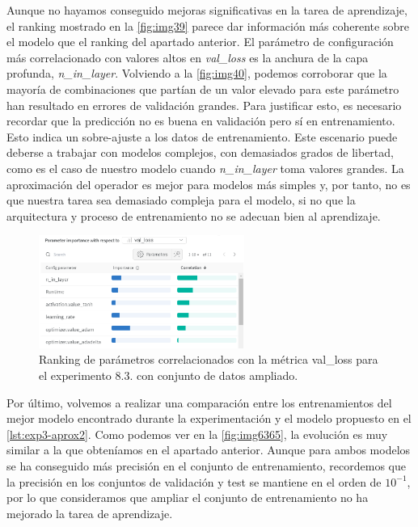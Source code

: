  Aunque no hayamos conseguido mejoras significativas en la tarea de aprendizaje, el ranking mostrado en la \autoref{fig:img39} parece dar información más coherente sobre el modelo que el ranking del apartado anterior. El parámetro de configuración más correlacionado con valores altos en \textit{val\_loss} es la anchura de la capa profunda, \textit{n\_in\_layer}. Volviendo a la \autoref{fig:img40}, podemos corroborar que la mayoría de combinaciones que partían de un valor elevado para este parámetro han resultado en errores de validación grandes.  Para justificar esto, es necesario recordar que la predicción no es buena en validación pero sí en entrenamiento. Esto indica un sobre-ajuste a los datos de entrenamiento. Este escenario puede deberse a trabajar con modelos complejos, con demasiados grados de libertad, como es el caso de nuestro modelo cuando \textit{n\_in\_layer} toma valores grandes. La aproximación del operador es mejor para modelos más simples y, por tanto, no es que nuestra tarea sea demasiado compleja para el modelo, si no que la arquitectura y proceso de entrenamiento no se adecuan bien al aprendizaje.




\begin{figure}[htbp]
    \centering
    \includegraphics[width=0.6\textwidth]{img/img39.png}
    \caption{Ranking de parámetros correlacionados con la métrica val\_loss para el experimento 8.3. con conjunto de datos ampliado.}
    \label{fig:img39}
\end{figure}

Por último, volvemos a realizar una comparación entre los entrenamientos del mejor modelo encontrado durante la experimentación y el modelo propuesto en el \autoref{lst:exp3-aprox2}. Como podemos ver en la \autoref{fig:img6365}, la evolución es muy similar a la que obteníamos en el apartado anterior. Aunque para ambos modelos se ha conseguido más precisión en el conjunto de entrenamiento, recordemos que la precisión en los conjuntos de validación y test se mantiene en el orden de $10^{-1}$, por lo que consideramos que ampliar el conjunto de entrenamiento no ha mejorado la tarea de aprendizaje. 

